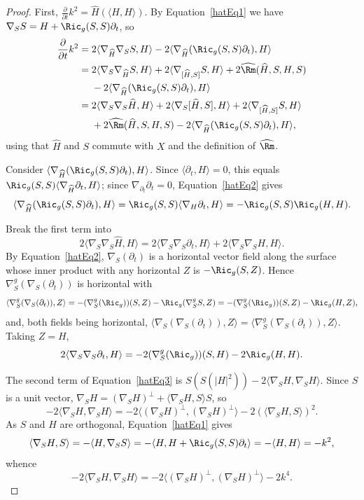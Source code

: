 \begin{proof}
First, $\frac{\partial}{\partial t}k^2=\widehat H(\langle H,H\rangle)$. By
Equation~\eqref{hatEq1} we have $\nabla_SS=H+\Ric_g(S,S)\partial_t$, so
\begin{align*}
\frac{\partial}{\partial t}k^2 = {} & 2\langle\nabla_{\widehat H}\nabla_SS,H\rangle-2\langle\nabla_{\widehat H}(\Ric_g(S,S)\partial_t),H\rangle \\
 = {} & 2\langle\nabla_S\nabla_{\widehat H}S,H\rangle+2\langle\nabla_{[\widehat H,S]}S,H\rangle+2\widehat{\Rm}(\widehat H,S,H,S) \\
 & -2\langle\nabla_{\widehat H}(\Ric_g(S,S)\partial_t),H\rangle \\
 = {} & 2\langle\nabla_S\nabla_S\widehat H,H\rangle+2\langle\nabla_S[\widehat H,S],H\rangle+2\langle\nabla_{[\widehat H,S]}S,H\rangle \\
 & +2\widehat{\Rm}(\widehat H,S,H,S)-2\langle\nabla_{\widehat H}(\Ric_g(S,S)\partial_t),H\rangle,
\end{align*}
using that $\widehat H$ and $S$ commute with $X$ and the definition of
$\widehat{\Rm}$.

Consider $\langle\nabla_{\widehat H}(\Ric_g(S,S)\partial_t),H\rangle$. Since
$\langle\partial_t,H\rangle=0$, this equals
$\Ric_g(S,S)\langle\nabla_{\widehat H}\partial_t,H\rangle$; since
$\nabla_{\partial_t}\partial_t=0$, Equation~\eqref{hatEq2} gives
$$\langle\nabla_{\widehat H}(\Ric_g(S,S)\partial_t),H\rangle=\Ric_g(S,S)\langle\nabla_H\partial_t,H\rangle=-\Ric_g(S,S)\Ric_g(H,H).$$

Break the first term into
\begin{equation}\label{hatEq3}
2\langle\nabla_S\nabla_S\widehat H,H\rangle=2\langle\nabla_S\nabla_S\partial_t,H\rangle+2\langle\nabla_S\nabla_SH,H\rangle.
\end{equation}
By Equation~\eqref{hatEq2}, $\nabla_S(\partial_t)$ is a horizontal vector field
along the surface whose inner product with any horizontal $Z$ is $-\Ric_g(S,Z)$.
Hence $\nabla^g_S(\nabla_S(\partial_t))$ is horizontal with
$$\langle\nabla^g_S(\nabla_S(\partial_t)),Z\rangle=-(\nabla^g_S(\Ric_g))(S,Z)-\Ric_g(\nabla^g_SS,Z)=-(\nabla^g_S(\Ric_g))(S,Z)-\Ric_g(H,Z),$$
and, both fields being horizontal,
$\langle\nabla_S(\nabla_S(\partial_t)),Z\rangle=\langle\nabla^g_S(\nabla_S(\partial_t)),Z\rangle$.
Taking $Z=H$,
$$2\langle\nabla_S\nabla_S\partial_t,H\rangle=-2(\nabla^g_S(\Ric_g))(S,H)-2\Ric_g(H,H).$$

The second term of Equation~\eqref{hatEq3} is
$S(S(|H|^2))-2\langle\nabla_SH,\nabla_SH\rangle$. Since $S$ is a unit vector,
$\nabla_SH=(\nabla_SH)^\perp+\langle\nabla_SH,S\rangle S$, so
$$-2\langle\nabla_SH,\nabla_SH\rangle=-2\langle(\nabla_SH)^\perp,(\nabla_SH)^\perp\rangle-2\left(\langle\nabla_SH,S\rangle\right)^2.$$
As $S$ and $H$ are orthogonal, Equation~\eqref{hatEq1} gives
$$\langle\nabla_SH,S\rangle=-\langle H,\nabla_SS\rangle=-\langle H,H+\Ric_g(S,S)\partial_t\rangle=-\langle H,H\rangle=-k^2,$$
whence
$$-2\langle\nabla_SH,\nabla_SH\rangle=-2\langle(\nabla_SH)^\perp,(\nabla_SH)^\perp\rangle-2k^4.$$


\end{proof}
